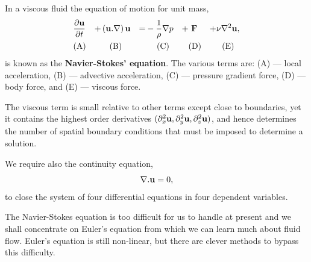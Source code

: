 \documentclass[twoside,a4paper,11pt]{report}
\begin{document}
In a viscous fluid the equation of motion for unit mass,
\begin{alignat*}{5}
& \frac{\partial {\bf u}}{\partial t} & +
& \left( {{{\bf u}}. \nabla } \right){{\bf u}}  & =
& -\frac{1}{\rho }\nabla p & + &\  \textbf{F} & + &\nu \nabla ^2{\bf u}, \\
&\hbox{(A)}&
&\ \ \ \hbox{(B) }&
&\ \ \ \ \hbox{(C)}&
&\hbox{(D)}&
&\ \ \hbox{(E)} 
\end{alignat*}
is known as the \textbf{Navier-Stokes' equation}. The various terms are: (A)
--- local acceleration, (B) --- advective acceleration, (C) --- pressure
gradient force, (D) --- body force, and (E) --- viscous force.

The viscous term is small relative to other terms except close to 
boundaries, yet it contains the highest order derivatives $(\partial_x ^2{\rm 
{\bf u}},\partial_y ^2{{\bf u}},\partial_z ^2{{\bf u}})$, and hence determines the 
number of spatial boundary conditions that must be imposed to determine a 
solution.

We require also the continuity equation,
\[
\nabla . {\bf u}=0,
\]
to close the system of four differential equations in four dependent 
variables.

The Navier-Stokes equation is too difficult for us to handle at present and 
we shall concentrate on Euler's equation from which we can learn much about 
fluid flow. Euler's equation is still non-linear, but there are clever 
methods to bypass this difficulty. 
\end{document}
